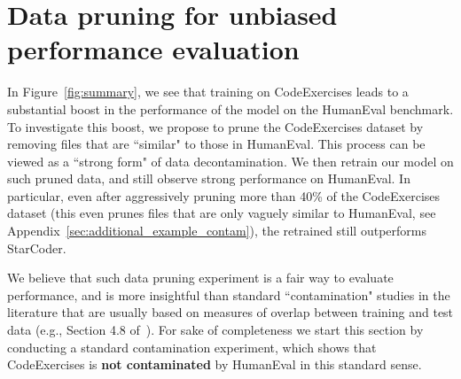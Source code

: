 \iffalse
One possible objection to the work presented so far is that our synthetic finetuned data is not valid and the model achieves high scores on HumanEval and MBPP due to memorization. To address this concern, we will examine the issue of data contamination in section~\ref{sec:contaim} using various metrics. In this section, we will demonstrate that our model achieves a high score \textbf{based on actual understanding} by (1) designing a diverse set of unconventional questions that are unlikely to appear in any training dataset, and (2) perturbing or increasing the difficulty of the existing questions in Humaneval. Our results show that the model's performance is consistent across both scenarios. \textbf{
Furthermore, we divided our group into two independent teams: one responsible for creating these testing dataset and the other for finetuning the model and generating the synthetic data. This way, we ensured that the dataset creators had no access to the synthetic data or the final model, and thus avoided any potential bias or leakage.}
\fi

\section{Data pruning for unbiased performance evaluation}
\label{sec:contaim}

In Figure~\ref{fig:summary}, we see that training on CodeExercises leads to a substantial boost in the performance of the model on the HumanEval benchmark. 
To investigate this boost, we propose to prune the CodeExercises dataset by removing files that are ``similar" to those in HumanEval. This process can be viewed as a ``strong form" of data decontamination. We then retrain our model on such pruned data, and still observe strong performance on HumanEval. In particular, even after aggressively pruning more than 40\% of the CodeExercises dataset (this even prunes files that are only vaguely similar to HumanEval, see Appendix~\ref{sec:additional_example_contam}), the retrained \phione still outperforms StarCoder.

We believe that such data pruning experiment is a fair way to evaluate performance, and is more insightful than standard ``contamination" studies in the literature that are usually based on measures of overlap between training and test data (e.g., Section 4.8 of~\cite{austin2021program}). For sake of completeness we start this section by conducting a standard contamination experiment, which shows that CodeExercises is \textbf{not contaminated} by HumanEval in this standard sense.

